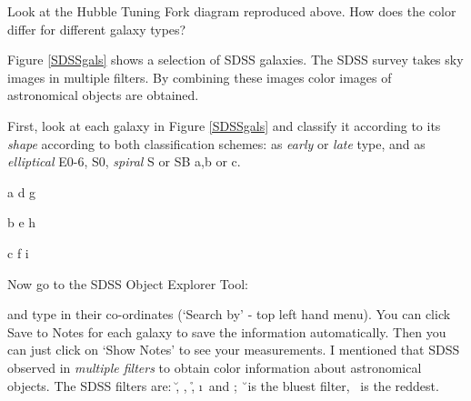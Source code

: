  Look at the Hubble Tuning Fork diagram reproduced above. How does the color differ for different galaxy types?



\begin{figure*}[ht]
        \centerline{}
        \caption{A selection of SDSS galaxies. }\label{SDSSgals}
         \end{figure*}


\noindent 
Figure \ref{SDSSgals} shows a selection of SDSS galaxies. The SDSS survey takes sky images in multiple filters. By combining these images color images of astronomical objects are obtained. 

\noindent First, look at each galaxy in Figure \ref{SDSSgals} and classify it according to its \emph{shape} according to both classification schemes: as \emph{early} or \emph{late} type, and as \emph{elliptical} E0-6, S0, \emph{spiral} S or SB a,b or c.

\vspace{20pt}

\noindent a \makebox[2cm]{\hrulefill}  \makebox[2cm]{\hrulefill}\makebox[1cm] d \makebox[2cm]{\hrulefill}  \makebox[2cm]{\hrulefill}\makebox[1cm] g \makebox[2cm]{\hrulefill}  \makebox[2cm]{\hrulefill}

\noindent b \makebox[2cm]{\hrulefill}  \makebox[2cm]{\hrulefill}\makebox[1cm] e \makebox[2cm]{\hrulefill}  \makebox[2cm]{\hrulefill}\makebox[1cm] h \makebox[2cm]{\hrulefill}  \makebox[2cm]{\hrulefill}

\noindent c \makebox[2cm]{\hrulefill} \makebox[2cm]{\hrulefill}\makebox[1cm] f \makebox[2cm]{\hrulefill}  \makebox[2cm]{\hrulefill}\makebox[1cm] i \makebox[2cm]{\hrulefill}  \makebox[2cm]{\hrulefill}

\vspace{20pt}


\noindent Now go to the SDSS Object Explorer Tool:


\noindent and type in their co-ordinates (‘Search by’ - top left hand menu). You can click Save to Notes for each galaxy to save the information automatically. Then you can just click on ‘Show Notes’ to see your measurements. 
I mentioned that SDSS observed in \emph{multiple filters} to obtain color information about astronomical objects. The SDSS filters are: \u, \g, \r, \i \ and \z; \u \ is the bluest filter, \z \ is the reddest.

